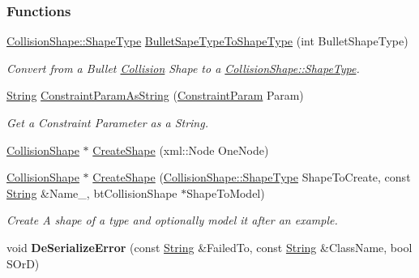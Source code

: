 \subsubsection*{Functions}
\begin{DoxyCompactItemize}
\item 
\hyperlink{classMezzanine_1_1CollisionShape_ad04186055565998879b64176d6dd100d}{CollisionShape::ShapeType} \hyperlink{namespaceMezzanine_af007af1ad839d251e61e95488ab78876}{BulletSapeTypeToShapeType} (int BulletShapeType)
\begin{DoxyCompactList}\small\item\em Convert from a Bullet \hyperlink{classMezzanine_1_1Collision}{Collision} Shape to a \hyperlink{classMezzanine_1_1CollisionShape_ad04186055565998879b64176d6dd100d}{CollisionShape::ShapeType}. \item\end{DoxyCompactList}\item 
\hyperlink{namespaceMezzanine_acf9fcc130e6ebf08e3d8491aebcf1c86}{String} \hyperlink{namespaceMezzanine_a11080ec435c80a89d4da498ea8049c3e}{ConstraintParamAsString} (\hyperlink{namespaceMezzanine_a6c62e8c2938fb203eb7a7072c12176f4}{ConstraintParam} Param)
\begin{DoxyCompactList}\small\item\em Get a Constraint Parameter as a String. \item\end{DoxyCompactList}\item 
\hyperlink{classMezzanine_1_1CollisionShape}{CollisionShape} $\ast$ \hyperlink{namespaceMezzanine_ac7be2623357ff699de474212404a4227}{CreateShape} (xml::Node OneNode)
\item 
\hyperlink{classMezzanine_1_1CollisionShape}{CollisionShape} $\ast$ \hyperlink{namespaceMezzanine_a945376a411966f62fad3f13e14550d74}{CreateShape} (\hyperlink{classMezzanine_1_1CollisionShape_ad04186055565998879b64176d6dd100d}{CollisionShape::ShapeType} ShapeToCreate, const \hyperlink{namespaceMezzanine_acf9fcc130e6ebf08e3d8491aebcf1c86}{String} \&Name\_\-, btCollisionShape $\ast$ShapeToModel)
\begin{DoxyCompactList}\small\item\em Create A shape of a type and optionally model it after an example. \item\end{DoxyCompactList}\item 
\hypertarget{namespaceMezzanine_afe96281c14ddf42e63226b6ef43fa8d3}{
void {\bfseries DeSerializeError} (const \hyperlink{namespaceMezzanine_acf9fcc130e6ebf08e3d8491aebcf1c86}{String} \&FailedTo, const \hyperlink{namespaceMezzanine_acf9fcc130e6ebf08e3d8491aebcf1c86}{String} \&ClassName, bool SOrD)}
\label{namespaceMezzanine_afe96281c14ddf42e63226b6ef43fa8d3}


\end{DoxyCompactItemize}
